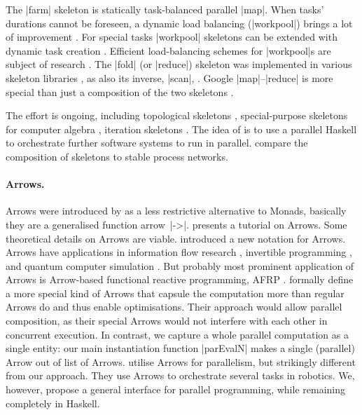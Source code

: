The |farm| skeleton \citep{Hey1990185,Eden:PPDP01,Kuchen05} is statically task-balanced parallel |map|. When tasks' durations cannot be foreseen, a dynamic load balancing (|workpool|) brings a lot of improvement \citep{Rudolph:1991:SLB:113379.113401,Eden:PPL03,Hippold2006,PADL08HMWS,Marlow2009}. For special tasks |workpool| skeletons can be extended with dynamic task creation \cite{WPEuropar06,Dinan:2009:SWS:1654059.1654113,brown2010ever}. Efficient load-balancing schemes for |workpool|s are subject of research \cite{Acar:2000:DLW:341800.341801,Blumofe:1999:SMC:324133.324234,vanNieuwpoort:2001:ELB:568014.379563,Chase:2005:DCW:1073970.1073974,4625841,Michael:2009:IWS:1594835.1504186}.
%
The |fold| (or |reduce|) skeleton was implemented in various skeleton libraries \cite{Kuchen2002,BUONO20102095,Dastgeer:2011:ASM:1984693.1984697,5361825}, as also its inverse, |scan|, \cite{Bischof2002,harris2007parallel}.
%
Google |map|--|reduce| is more special than just a composition of the two skeletons \cite{LAMMEL20081,Berthold2009-mr}.

The effort is ongoing, including topological skeletons \cite{Eden:PARCO05}, special-purpose skeletons for computer algebra \cite{Berthold2009-fft,lobachev-phd,Lobachev2012,janjic2013space}, iteration skeletons \cite{Dieterle2013}. The idea of \citet{scscp} is to use a parallel Haskell to orchestrate further software systems to run in parallel. \citet{dieterle_horstmeyer_loogen_berthold_2016} compare the composition of skeletons to stable process networks.

\paragraph{Arrows.}
Arrows were introduced by \citet{HughesArrows} as a less restrictive alternative to Monads, basically they are a generalised function arrow~|->|. \citet{Hughes2005} presents a tutorial on Arrows. Some theoretical details on Arrows \cite{jacobs_heunen_hasuo_2009,LINDLEY201197,ATKEY201119} are viable. \citet{Paterson:2001:NNA:507669.507664} introduced a new notation for Arrows. Arrows have applications in information flow research \cite{1648705,LI20101974,Russo:2008:LLI:1411286.1411289}, invertible programming \cite{Alimarine:2005:BAA:1088348.1088357}, and quantum computer simulation \cite{vizzotto_altenkirch_sabry_2006}. But probably most prominent application of Arrows is Arrow-based functional reactive programming, AFRP \cite{Nilsson:2002:FRP:581690.581695,Hudak2003,Czaplicki:2013:AFR:2499370.2462161}.
\citet{Liu:2009:CCA:1631687.1596559} formally define a more special kind of Arrows that capsule the computation more than regular Arrows do and thus enable optimisations. Their approach would allow parallel composition, as their special Arrows would not interfere with each other in concurrent execution. In contrast, we capture a whole parallel computation as a single entity: our main instantiation function |parEvalN| makes a single (parallel) Arrow out of list of Arrows. \citet{Huang2007} utilise Arrows for parallelism, but strikingly different from our approach. They use Arrows to orchestrate several tasks in robotics. We, however, propose a general interface for parallel programming, while remaining completely in Haskell.

